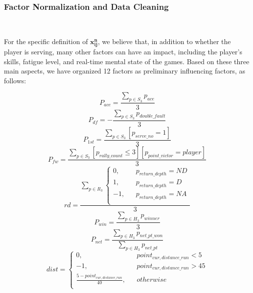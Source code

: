 \subsubsection{Factor Normalization and Data Cleaning}~{}

For the specific definition of $\boldsymbol{x_{ij}^{n}}$, we believe that, 
in addition to whether the player is serving, many other factors can have an impact,
including the player's skills, fatigue level, and real-time mental state of the games.
Based on these three main aspects, 
we have organized 12 factors as preliminary influencing factors, as follows:

\begin{equation}
    P_{ace} = \frac{\sum_{p \in S_3} p_{ace}}{3}
\end{equation}
\begin{equation}
    P_{df} = -\frac{\sum_{p \in S_3} p_{double\_fault}}{3}
\end{equation}
\begin{equation}
    P_{1st} = \frac{\sum_{p \in S_3} [p_{serve\_no} = 1]}{3}
\end{equation}
\begin{equation}
    P_{fw} = \frac{\sum_{p \in S_3} [p_{rally\_count} \le 3] [p_{point\_victor} = player]}{3}
\end{equation}
\begin{equation}
    rd = \frac{\sum_{p \in R_3} \left\{
        \begin{aligned}
        0, && p_{return\_depth} = ND \\
        1, && p_{return\_depth} = D \\
        -1, && p_{return\_depth} = NA \\
        \end{aligned}
        \right.}{3}
\end{equation}
\begin{equation}
    P_{win} = \frac{\sum_{p \in H_3} p_{winner}}{3}
\end{equation}
\begin{equation}
    P_{net} = \frac{\sum_{p \in H_3} p_{net\_pt\_won}}{\sum_{p \in H_3} p_{net\_pt}}
\end{equation}
\begin{equation}
    dist = \left\{
        \begin{aligned}
        0, && point_{cur, distance\_run} < 5 \\
        -1, && point_{cur, distance\_run} > 45 \\
        \frac{5 - point_{cur, distance\_run}}{40}, && otherwise \\
        \end{aligned}
        \right.
\end{equation}
